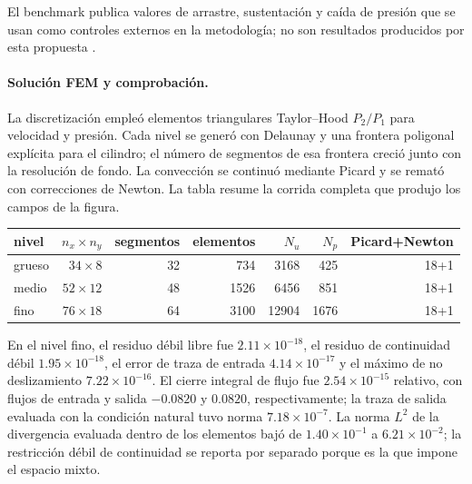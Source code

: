 El benchmark publica valores de arrastre, sustentación y caída de presión que
se usan como controles externos en la metodología; no son resultados
producidos por esta propuesta \cite{dfgRe20}.

\paragraph{Solución FEM y comprobación.}
La discretización empleó elementos triangulares Taylor--Hood \(P_2/P_1\) para
velocidad y presión. Cada nivel se generó con Delaunay y una frontera
poligonal explícita para el cilindro; el número de segmentos de esa frontera
creció junto con la resolución de fondo. La convección se continuó mediante
Picard y se remató con correcciones de Newton. La tabla resume la corrida
completa que produjo los campos de la figura.

\begin{center}
\small
\begin{tabular}{lrrrrrr}
\hline
nivel & $n_x\times n_y$ & segmentos & elementos & $N_u$ & $N_p$ & Picard+Newton\\
\hline
grueso & $34\times8$ & 32 & 734 & 3168 & 425 & 18+1\\
medio  & $52\times12$ & 48 & 1526 & 6456 & 851 & 18+1\\
fino   & $76\times18$ & 64 & 3100 & 12904 & 1676 & 18+1\\
\hline
\end{tabular}
\end{center}

En el nivel fino, el residuo débil libre fue
\(2.11\times10^{-18}\), el residuo de continuidad débil
\(1.95\times10^{-18}\), el error de traza de entrada
\(4.14\times10^{-17}\) y el máximo de no deslizamiento
\(7.22\times10^{-16}\). El cierre integral de flujo fue
\(2.54\times10^{-15}\) relativo, con flujos de entrada y salida
\(-0.0820\) y \(0.0820\), respectivamente; la traza de salida evaluada con
la condición natural tuvo norma \(7.18\times10^{-7}\). La norma \(L^2\) de
la divergencia evaluada dentro de los elementos bajó de
\(1.40\times10^{-1}\) a \(6.21\times10^{-2}\); la restricción débil de
continuidad se reporta por separado porque es la que impone el espacio mixto.

